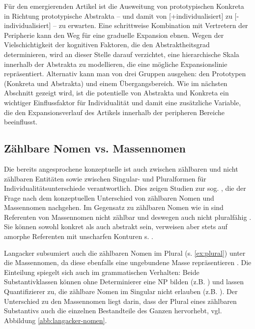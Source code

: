 Für den emergierenden Artikel ist die Ausweitung von prototypischen Konkreta in Richtung prototypische Abstrakta -- und damit von [+individualisiert] zu [-individualisiert] -- zu erwarten. Eine schrittweise Kombination mit Vertretern der Peripherie kann den Weg für eine graduelle Expansion ebnen. Wegen der Vielschichtigkeit der kognitiven Faktoren, die den Abstraktheitsgrad determinieren, wird an dieser Stelle darauf verzichtet, eine hierarchische Skala innerhalb der  Abstrakta zu modellieren, die eine mögliche Expansionslinie repräsentiert. Alternativ kann man von drei Gruppen ausgehen: den Prototypen (Konkreta und Abstrakta) und einem Übergangsbereich. Wie im nächsten Abschnitt gezeigt wird, ist die potentielle  von Abstrakta und Konkreta ein wichtiger Einflussfaktor für Individualität und damit eine zusätzliche Variable, die den Expansionsverlauf des Artikels innerhalb der peripheren Bereiche beeinflusst.  

\subsection{Zählbare Nomen vs. Massennomen}\label{section:mass}

Die bereits angesprochene konzeptuelle  ist auch zwischen zählbaren und nicht zählbaren Entitäten sowie zwischen Singular- und Pluralformen für Individualitätsunterschiede verantwortlich. Dies zeigen Studien zur sog.  \parencite[s.][]{Jackendoff1991, Langacker1991, Bisle-Muller1991, Rijkhoff1991,Rijkhoff2002, Corbett2000, Massam2012,Zifonun2012}, die der Frage nach dem konzeptuellen Unterschied von zählbaren Nomen und Massennomen nachgehen. Im Gegensatz zu zählbaren Nomen wie in  sind Referenten von Massennomen nicht zählbar und deswegen auch nicht pluralfähig \parencite[77]{Langacker1991}. Sie können sowohl konkret als auch abstrakt sein, verweisen aber stets auf amorphe Referenten mit unscharfen Konturen s. . 

\begin{exe}
	\ex \label{ex:zaehlbarkeit}
	\begin{xlist}
		\ex \label{ex:count} 
 		\ex \label{ex:mass} 
 	 	\ex \label{ex:plural}  
 			\end{xlist}
\end{exe}

\noindent
Langacker subsumiert auch die zählbaren Nomen im Plural (s. \ref{ex:plural}) unter die Massennomen, da diese ebenfalls eine ungebundene Masse repräsentieren \parencite[77]{Langacker1991}. Die Einteilung spiegelt sich auch im grammatischen Verhalten: Beide Substantivklassen können ohne Determinierer eine NP bilden (z.B. ) und lassen Quantifizierer zu, die zählbare Nomen im Singular nicht erlauben (z.B. ). Der Unterschied zu den Massennomen liegt darin, dass der Plural eines zählbaren Substantivs auch die einzelnen Bestandteile des Ganzen hervorhebt, vgl. Abbildung \ref{abb:langacker-nomen}.

